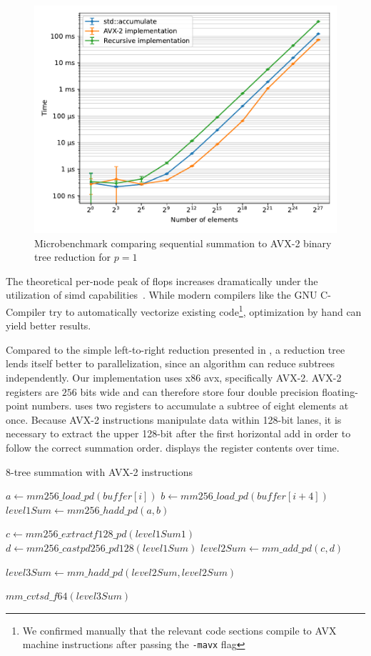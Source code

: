 \begin{figure}
\centering
\includegraphics[scale=0.9]{figures/benchmarkVectorization}
\caption{Microbenchmark comparing sequential summation to AVX-2 binary tree reduction for $p=1$}
\label{fig:benchmarkVectorization}
\end{figure}

The theoretical per-node peak of \gls{flops} increases dramatically under the utilization of \gls{simd} capabilities~\cite{dolbeau_theoretical_2018}.
While modern compilers like the GNU C-Compiler try to automatically vectorize existing code\footnote{We confirmed manually that the relevant code sections compile to AVX machine instructions after passing the \texttt{-mavx} flag}, optimization by hand can yield better results.

Compared to the simple left-to-right reduction presented in , a reduction tree lends itself better to parallelization, since an algorithm can reduce subtrees independently.
Our implementation uses x86 \gls{avx}, specifically AVX-2.
AVX-2 registers are $256$ bits wide and can therefore store four double precision floating-point numbers.
 uses two registers to accumulate a subtree of eight elements at once.
Because AVX-2 instructions manipulate data within 128-bit lanes, it is necessary to extract the upper 128-bit after the first horizontal add in order to follow the correct summation order.
 displays the register contents over time.
\begin{algorithm}
\caption{8-tree summation with AVX-2 instructions}
\label{algo:AVXTreeAccumulation}
\DontPrintSemicolon
\SetAlgoLined
{}

$a \gets mm256\_load\_pd(buffer[i])$\;
$b \gets mm256\_load\_pd(buffer[i + 4])$\;
$level1Sum \gets mm256\_hadd\_pd(a,b)$\;

$c \gets mm256\_extractf128\_pd(level1Sum 1)$\;
$d \gets mm256\_castpd256\_pd128(level1Sum)$\;
$level2Sum \gets mm\_add\_pd(c, d)$\;

$level3Sum \gets mm\_hadd\_pd(level2Sum, level2Sum)$\;

\Return $mm\_cvtsd\_f64(level3Sum)$\;
\end{algorithm}

